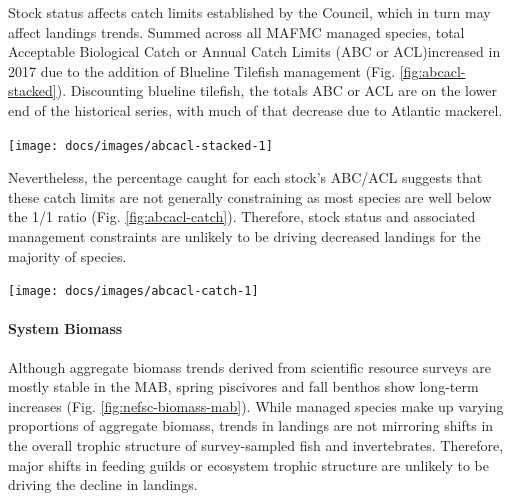 \documentclass[
  10pt,
]{article}
\let\origfigure\figure
\let\endorigfigure\endfigure
\renewenvironment{figure}[1][2] {
    \expandafter\origfigure\expandafter[H]
} {
    \endorigfigure
}
\begin{document}
Stock status affects catch limits established by the Council, which in
turn may affect landings trends. Summed across all MAFMC managed
species, total Acceptable Biological Catch or Annual Catch Limits (ABC
or ACL)increased in 2017 due to the addition of Blueline Tilefish
management (Fig. \ref{fig:abcacl-stacked}). Discounting blueline
tilefish, the totals ABC or ACL are on the lower end of the historical
series, with much of that decrease due to Atlantic mackerel.

\begin{figure}

{\centering \texttt{[image: docs/images/abcacl-stacked-1]} 

}

\caption{Sum of catch limits across all MAFMC managed fisheries.}\label{fig:abcacl-stacked}
\end{figure}

Nevertheless, the percentage caught for each stock's ABC/ACL suggests
that these catch limits are not generally constraining as most species
are well below the 1/1 ratio (Fig. \ref{fig:abcacl-catch}). Therefore,
stock status and associated management constraints are unlikely to be
driving decreased landings for the majority of species.

\begin{figure}

{\centering \texttt{[image: docs/images/abcacl-catch-1]} 

}

\caption{Catch divided by ABC/ACL for MAFMC managed fisheies. Chub mackerel removed due extremely low catch. Outliers = Recreational Black Sea Bass.}\label{fig:abcacl-catch}
\end{figure}

\hypertarget{system-biomass}{%
\paragraph{System Biomass}\label{system-biomass}}

Although aggregate biomass trends derived from scientific resource
surveys are mostly stable in the MAB, spring piscivores and fall benthos
show long-term increases (Fig. \ref{fig:nefsc-biomass-mab}). While
managed species make up varying proportions of aggregate biomass, trends
in landings are not mirroring shifts in the overall trophic structure of
survey-sampled fish and invertebrates. Therefore, major shifts in
feeding guilds or ecosystem trophic structure are unlikely to be driving
the decline in landings.
\end{document}

